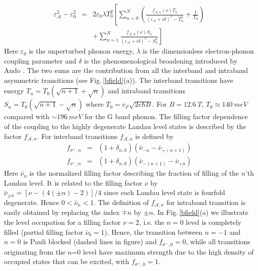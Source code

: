 \documentclass[prl,aps,superscriptaddress,showpacs,reprint]{revtex4-1}
\begin{document}
\begin{eqnarray}
\label{greens-full}
\varepsilon_{\mathcal{A}}^2-\varepsilon_0^2 &=& 2\varepsilon_0 \lambda T_0^2 \left[ \sum_{n=0}^N\left(\frac{f_{\mathcal{A},n}\left(\nu\right) T_n}{\left(\varepsilon_{\mathcal{A}}+i\delta\right)^2-T_n^2}+\frac{1}{T_n}\right)\right.\nonumber \\
& &\left. +\sum_{n=1}^{N}\frac{f_{\mathcal{A},n}\left(\nu\right) S_n}{\left(\varepsilon_{\mathcal{A}}+i\delta\right)^2-S_n^2}\right]
\end{eqnarray}
Here $\varepsilon_0$ is the unperturbed phonon energy, $\lambda$ is the dimensionless electron-phonon coupling parameter and $\delta$ is the phenomenological broadening introduced by Ando \cite{ando2007magnetic}. The two sums are the contribution from all the interband and intraband asymmetric transitions (see Fig.\,\ref{bfield}(a)). The interband transitions have energy $T_n=T_0\left(\sqrt{n+1}+\sqrt{n}\right)$ and intraband transitions $S_n=T_0\left(\sqrt{n+1}-\sqrt{n}\right)$ where $T_0=v_F\sqrt{2e\hbar B}$. For $B=12.6\: T$, $T_0 \approx 140\: meV$ compared with $\sim 196\: meV$ for the G band phonon.
The filling factor dependence of the coupling to the highly degenerate Landau level states is described by the factor $f_{\mathcal{A},n}$. For interband transitions $f_{\mathcal{A},n}$ is defined by
\begin{eqnarray}
\label{fterm}
f_{\sigma^+,n}&=&(1+\delta_{n,0})(\bar{\nu}_{-n}-\bar{\nu}_{+(n+1)})\nonumber\\
f_{\sigma^-,n}&=&(1+\delta_{n,0})(\bar{\nu}_{-(n+1)}-\bar{\nu}_{+n})
\end{eqnarray}
Here  $\bar{\nu}_{n} $ is the normalized  filling factor describing the fraction of filling of the $n$’th Landau level. It is related to the filling factor $\nu$ by $\bar{\nu}_{\pm n} = \left[\nu -(4(\pm n)-2)\right]/4$ since each Landau level state is fourfold degenerate.
Hence $0<\bar{\nu}_{n}<1$. The definition of $f_{\mathcal{A},n}$ for intraband transition is easily obtained by replacing the index $\mp n$ by $\pm n$. In  Fig.\,\ref{bfield}(a) we illustrate the level occupation for a filling factor $\nu=2$, i.e. the $n=0$ level is completely filled (partial filling factor $\bar{\nu}_0=1$). Hence,  the transition between $n=-1$ and $ n=0$ is Pauli blocked (dashed lines in figure) and  $f_{\sigma^-,0}=0$, while all transitions originating from the $n$=$0$ level have maximum strength due to the high density of occupied states that can be excited, with $f_{\sigma^+,0}=1$.
\end{document}
